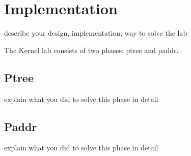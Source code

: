 \chapter{Implementation}

describe your design, implementation, way to solve the lab

The Kernel lab consists of two phases: ptree and paddr.

\section{Ptree}
explain what you did to solve this phase in detail

\section{Paddr}
explain what you did to solve this phase in detail